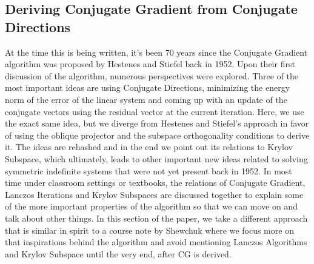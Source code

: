 \documentclass[]{article}
\theoremstyle{definition}
\begin{document}
    \subsection{Deriving Conjugate Gradient from Conjugate Directions}
        At the time this is being written, it's been 70 years since the Conjugate Gradient algorithm was proposed by Hestenes and Stiefel back in 1952\cite{paper:cg_original}. Upon their first discussion of the algorithm, numerous perspectives were explored. Three of the most important ideas are using Conjugate Directions, minimizing the energy norm of the error of the linear system and coming up with an update of the conjugate vectors using the residual vector at the current iteration. Here, we use the exact same idea, but we diverge from Hestenes and Stiefel's approach in favor of using the oblique projector and the subspace orthogonality conditions to derive it. The ideas are rehashed and in the end we point out its relations to Krylov Subspace, which ultimately, leads to other important new ideas related to solving symmetric indefinite systems that were not yet present back in 1952. In most time under classroom settings or textbooks, the relations of Conjugate Gradient, Lanczos Iterations and Krylov Subspaces are discussed together to explain some of the more important properties of the algorithm so that we can move on and talk about other things. In this section of the paper, we take a different approach that is similar in spirit to a course note by Shewchuk \cite{notes:painless_cg} where we focus more on that inspirations behind the algorithm and avoid mentioning Lanczos Algorithms and Krylov Subspace until the very end, after CG is derived.   
\end{document}
